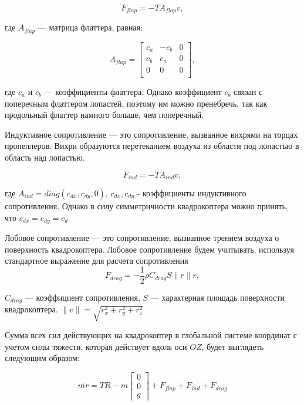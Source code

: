 \begin{equation}
F_{flap} = -T A_{flap} v,
\end{equation}

где \(A_{flap}\) --- матрица флаттера, равная:

\begin{equation}
A_{flap} = \begin{bmatrix}
    c_a & -c_b & 0 \\
    c_b & c_a & 0 \\
    0 & 0 & 0 \\
\end{bmatrix},
\end{equation}

где \(c_a\) и \(c_b\) --- коэффициенты флаттера. Однако коэффициент \(c_b\) связан с поперечным флаттером 
лопастей, поэтому им можно пренебречь, так как продольный флаттер намного больше, чем поперечный. 

Индуктивное сопротивление --- это сопротивление, вызванное вихрями на торцах пропеллеров. Вихри 
образуются перетеканием воздуха из области под лопастью в область над лопастью.

\begin{equation}
F_{ind} = -T A_{ind} v,
\end{equation}

где \(A_{ind}=diag(c_{dx}, c_{dy}, 0)\), \(c_{dx}, c_{dy}\) - коэффициенты индуктивного сопротивления. Однако в силу 
симметричности квадрокоптера можно принять, что \(c_{dx}=c_{dy}=c_{d}\)


Лобовое сопротивление --- это сопротивление, вызванное трением воздуха о поверхность квадрокоптера.
Лобовое сопротивление будем учитывать, используя стандартное выражение для расчета сопротивления
\begin{equation}
F_{drag} = - \frac{1}{2} \rho  C_{drag} S \| r \| r,
\end{equation}

\(C_{drag}\) --- коэффициент сопротивления, \(S\) --- характерная площадь поверхности квадрокоптера.
\(\| v \|= \sqrt{r_x^2 + r_y^2 + r_z^2}\)

Сумма всех сил действующих на квадрокоптер в глобальной системе координат с учетом силы тяжести, которая
действует вдоль оси \(OZ\), будет выглядеть следующим образом:

\begin{equation}
m \ddot{r} =
T R - m \begin{bmatrix} 0 \\ 0 \\ g \end{bmatrix} + F_{flap} + F_{ind} + F_{drag}
\end{equation}


